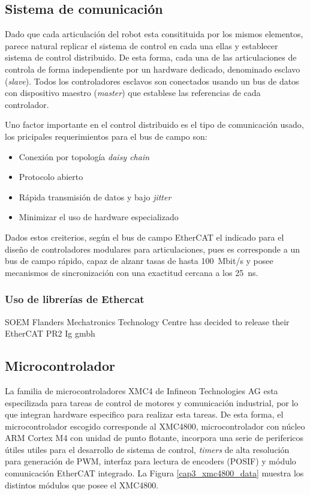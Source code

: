 \subsection{Sistema de comunicación}

Dado que cada articulación del robot esta consitituida por los mismos elementos, parece natural replicar el sistema de control en cada una ellas y establecer sistema de control distribuido. De esta forma, cada una de las articulaciones de controla de forma independiente por un hardware dedicado, denominado esclavo (\textit{slave}). Todos los controladores esclavos son conectados usando un bus de datos con dispositivo maestro (\textit{master}) que establese las referencias de cada controlador.

Uno factor importante en el control distribuido es el tipo de comunicación usado, los pricipales requerimientos para el bus de campo son:
\begin{itemize}
\item Conexión por topología \textit{daisy chain}
\item Protocolo abierto
\item Rápida transmisión de datos y bajo \textit{jitter} 
\item Minimizar el uso de hardware especializado
\end{itemize}

Dados estos creiterios, según \cite{liu2015} el bus de campo EtherCAT el indicado para el diseño de controladores modulares para articulaciones, pues es corresponde a un bus de campo rápido, capaz de alzanr tasas de hasta \SI{100}{Mbit/s} y posee mecanismos de sincronización con una exactitud cercana a los \SI{25}{\nano\second}.

\subsubsection{Uso de librerías de Ethercat}

SOEM
Flanders Mechatronics Technology Centre has decided to release their EtherCAT PR2
Ig gmbh

\subsection{Microcontrolador}

La familia de microcontroladores XMC4 de Infineon Technologies AG esta especilizada para tareas de control de motores y comunicación industrial, por lo que integran hardware especifico para realizar esta tareas. De esta forma, el microcontrolador escogido corresponde al XMC4800, microcontrolador con núcleo ARM Cortex M4 con unidad de punto flotante, incorpora una serie de perifericos útiles utiles para el desarrollo de sistema de control, \textit{timers} de alta resolución para generación de PWM, interfaz para lectura de encoders (POSIF) y módulo comunicación EtherCAT integrado. La Figura \ref{cap3_xmc4800_data} muestra los distintos módulos que posee el XMC4800.

